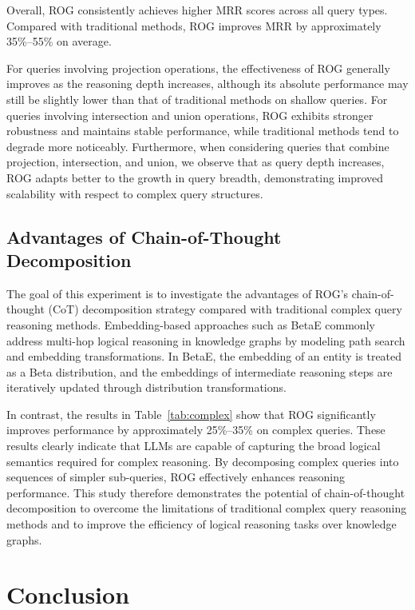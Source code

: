 \documentclass[11pt]{article}
\begin{document}
Overall, ROG consistently achieves higher MRR scores across all query types.
Compared with traditional methods, ROG improves MRR by approximately 35\%--55\% on average.

For queries involving projection operations, the effectiveness of ROG generally improves as the reasoning depth increases, although its absolute performance may still be slightly lower than that of traditional methods on shallow queries.
For queries involving intersection and union operations, ROG exhibits stronger robustness and maintains stable performance, while traditional methods tend to degrade more noticeably.
Furthermore, when considering queries that combine projection, intersection, and union, we observe that as query depth increases, ROG adapts better to the growth in query breadth, demonstrating improved scalability with respect to complex query structures.


\subsection{Advantages of Chain-of-Thought Decomposition}
\label{sec:cot_advantage}

The goal of this experiment is to investigate the advantages of ROG’s chain-of-thought (CoT) decomposition strategy compared with traditional complex query reasoning methods.
Embedding-based approaches such as BetaE commonly address multi-hop logical reasoning in knowledge graphs by modeling path search and embedding transformations.
In BetaE, the embedding of an entity is treated as a Beta distribution, and the embeddings of intermediate reasoning steps are iteratively updated through distribution transformations.

In contrast, the results in Table~\ref{tab:complex} show that ROG significantly improves performance by approximately 25\%--35\% on complex queries.
These results clearly indicate that LLMs are capable of capturing the broad logical semantics required for complex reasoning.
By decomposing complex queries into sequences of simpler sub-queries, ROG effectively enhances reasoning performance.
This study therefore demonstrates the potential of chain-of-thought decomposition to overcome the limitations of traditional complex query reasoning methods and to improve the efficiency of logical reasoning tasks over knowledge graphs.




\section{Conclusion}
\end{document}

